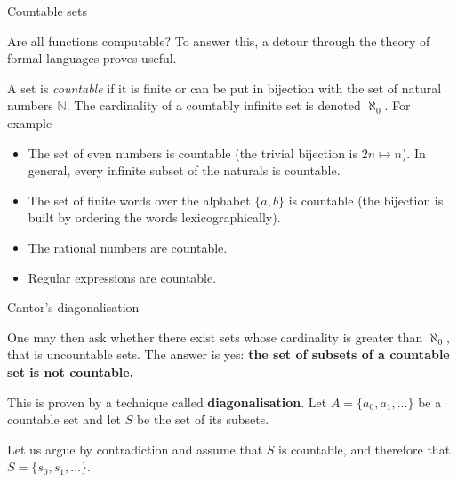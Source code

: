 \documentclass[compress,dvips,xcolor={dvipsnames},t]{beamer}
\begin{document}
%
\begin{frame}{Countable sets}

Are all functions computable? To answer this, a detour through the
theory of formal languages proves useful.

\bigskip

A set is \emph{countable} if it is finite or can be put in
bijection with the set of natural numbers $\mathbb{N}$. The
cardinality of a countably infinite set is denoted $\aleph_0$. For
example
\begin{itemize}

  \item The set of even numbers is countable (the trivial bijection
  is $2n \mapsto n$). In general, every infinite subset of the
  naturals is countable.

  \item The set of finite words over the alphabet $\{a,b\}$ is
  countable (the bijection is built by ordering the words
  lexicographically).

  \item The rational numbers are countable.

  \item Regular expressions are countable.

\end{itemize}

\end{frame}

%
\begin{frame}{Cantor's diagonalisation}

One may then ask whether there exist sets whose cardinality is greater
than $\aleph_0$, that is uncountable sets. The answer is yes:
\textbf{the set of subsets of a countable set is not countable.}

\bigskip

This is proven by a technique called \textbf{diagonalisation}. Let $A
= \{a_0, a_1, \ldots\}$ be a countable set and let $S$ be the set of
its subsets.

\bigskip

Let us argue by contradiction and assume that $S$ is countable, and
therefore that $S = \{s_0, s_1, \ldots\}$.

\end{frame}
\end{document}

